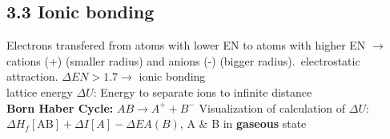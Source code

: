 \subsection{3.3 Ionic bonding}
    Electrons transfered from atoms with lower EN to atoms with higher EN $\rightarrow$ cations (+) (smaller radius) and anions (-) (bigger radius).\ electrostatic attraction. $\Delta EN > 1.7 \rightarrow$ ionic bonding\\
    lattice energy $\Delta U$: Energy to separate ions to infinite distance\\
    \textbf{Born Haber Cycle:} $AB \rightarrow A^+ + B^-$ Visualization of calculation of $\Delta U$: $\Delta H_f[\text{AB}] + \Delta I[A] - \Delta EA(B)$, A \& B in \textbf{gaseous} state